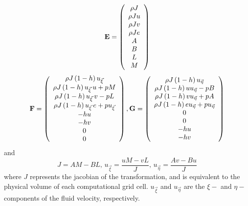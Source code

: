 \documentclass[12pt,letterpaper]{article}
\begin{document}
\begin{equation}
\label{eq:vectors}
\bf{E} = \left(
\begin{array}{c}
\rho J \\
\rho J u \\
\rho J v \\
\rho J e \\
A \\
B \\
L \\
M 
\end{array}
\right)
\end{equation}
\begin{equation}
\label{eq:vector_fluxes}
\bf{F} = \left(
\begin{array}{c}
\rho J \left( 1 - h \right) u_{\vec{\xi}} \\
\rho J \left( 1 - h \right) u_{\vec{\xi}} \,u + p M \\
\rho J \left( 1 - h \right) u_{\vec{\xi}} \,v - p L \\
\rho J \left( 1 - h \right) u_{\vec{\xi}} \,e + p u_{\vec{\xi}} \\
- h u \\
- h v \\
0 \\
0
\end{array}
\right)
,
\bf{G} = \left(
\begin{array}{c}
\rho J \left( 1 - h \right) u_{\vec{\eta}} \\
\rho J \left( 1 - h \right) u u_{\vec{\eta}} - p B \\
\rho J \left( 1 - h \right) v u_{\vec{\eta}} + p A \\
\rho J \left( 1 - h \right) e u_{\vec{\eta}} + p u_{\vec{\eta}} \\
0 \\
0 \\
- h u \\
- h v
\end{array}
\right)
\end{equation}
\noindent and
\begin{equation}
\label{eq:intermediates}
J = A M - B L , \,u_{\vec{\xi}} = \frac{u M - v L}{J} , \,u_{\vec{\eta}} = \frac{A v - B u}{J}
\end{equation}
\noindent where $J$ represents the jacobian of the transformation, and is
equivalent to the physical volume of each computational grid cell. $u_{\vec{\xi}}$
and $u_{\vec{\eta}}$ are the $\xi-$ and $\eta-$ components of the fluid velocity,
respectively.
\end{document}
